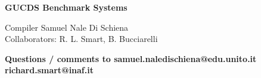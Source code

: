 \documentclass[12pt]{article}
\begin{document}
\begin{center}
{\bf GUCDS Benchmark Systems} \\

\end{center}
\noindent
Compiler Samuel Nale Di Schiena\\  		%
Collaborators: R. L. Smart, B. Bucciarelli	%


\vspace{1cm}
\noindent
{\bf Questions / comments to \newline
samuel.naledischiena@edu.unito.it \newline 	%
richard.smart@inaf.it}				%




\newpage

 
\end{document}
